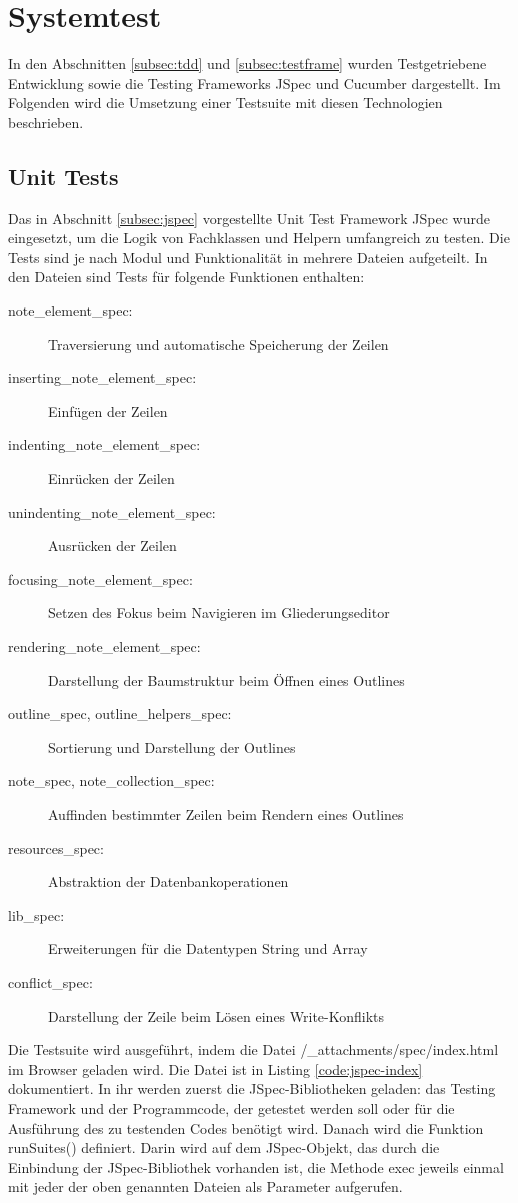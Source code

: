 \section{Systemtest}
\label{sec:systemtest}

In den Abschnitten \ref{subsec:tdd} und \ref{subsec:testframe} wurden Testgetriebene Entwicklung sowie die Testing Frameworks JSpec und Cucumber dargestellt. Im Folgenden wird die Umsetzung einer Testsuite mit diesen Technologien beschrieben.


\subsection{Unit Tests}
\label{subsec:unittests}

Das in Abschnitt \ref{subsec:jspec} vorgestellte Unit Test Framework JSpec wurde eingesetzt, um die Logik von Fachklassen und Helpern umfangreich zu testen. Die Tests sind je nach Modul und Funktionalität in mehrere Dateien aufgeteilt. In den Dateien sind Tests für folgende Funktionen enthalten: 

\begin{description}
  \item[note\_element\_spec:] Traversierung und automatische Speicherung der Zeilen
  \item[inserting\_note\_element\_spec:] Einfügen der Zeilen
  \item[indenting\_note\_element\_spec:] Einrücken der Zeilen
  \item[unindenting\_note\_element\_spec:] Ausrücken der Zeilen
  \item[focusing\_note\_element\_spec:] Setzen des Fokus beim Navigieren im Gliederungseditor
  \item[rendering\_note\_element\_spec:] Darstellung der Baumstruktur beim Öffnen eines Outlines
  \item[outline\_spec, outline\_helpers\_spec:] Sortierung und Darstellung der Outlines
  \item[note\_spec, note\_collection\_spec:] Auffinden bestimmter Zeilen beim Rendern eines Outlines
  \item[resources\_spec:] Abstraktion der Datenbankoperationen
  \item[lib\_spec:] Erweiterungen für die Datentypen String und Array
  \item[conflict\_spec:] Darstellung der Zeile beim Lösen eines Write-Konflikts
\end{description}
  

Die Testsuite wird ausgeführt, indem die Datei {\selectfont /\_attachments/spec/index.html} im Browser geladen wird. Die Datei ist in Listing \ref{code:jspec-index} dokumentiert. In ihr werden zuerst die  JSpec-Bibliotheken geladen: das Testing Framework und der Programmcode, der getestet werden soll oder für die Ausführung des zu testenden Codes benötigt wird. Danach wird die Funktion {\selectfont runSuites()} definiert. Darin wird auf dem {\selectfont JSpec}-Objekt, das durch die Einbindung der JSpec-Bibliothek vorhanden ist, die Methode {\selectfont exec} jeweils einmal mit jeder der oben genannten Dateien als Parameter aufgerufen. 


